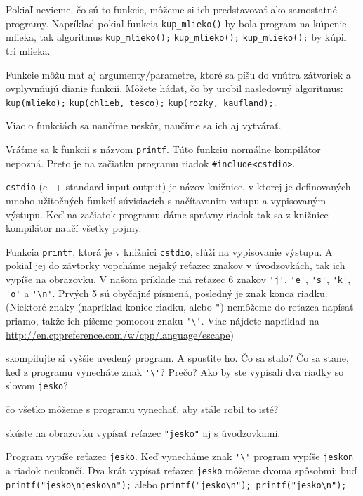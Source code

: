 \medskip

Pokiaľ nevieme, čo sú to funkcie, môžeme si ich predstavovať ako samostatné
programy. Napríklad pokiaľ funkcia \verb!kup_mlieko()! by bola program na
kúpenie mlieka, tak algoritmus \verb!kup_mlieko();! \verb!kup_mlieko();!
\verb!kup_mlieko();! by kúpil tri mlieka.

Funkcie môžu mať aj argumenty/parametre, ktoré sa píšu do vnútra zátvoriek a
ovplyvnňujú dianie funkcií. Môžete hádať, čo by urobil nasledovný algoritmus:
\verb!kup(mlieko);! \verb!kup(chlieb, tesco);! \verb!kup(rozky, kaufland);!.

Viac o funkciách sa naučíme neskôr, naučíme sa ich aj vytvárať.

\medskip

Vráťme sa k funkcii s názvom \verb!printf!. Túto funkciu normálne kompilátor
nepozná.  Preto je na začiatku programu riadok \verb!#include<cstdio>!.

\verb!cstdio! (c++ standard input output) je názov knižnice, v ktorej je
definovaných mnoho užitočných funkcií súvisiacich s načítavanim vstupu a
vypisovaným výstupu. Keď na začiatok programu dáme správny riadok tak sa z
knižnice kompilátor naučí všetky pojmy.

Funkcia \verb!printf!, ktorá je v knižnici \verb!cstdio!, slúži na vypisovanie
výstupu.  A pokiaľ jej do závtorky vopcháme nejaký reťazec znakov v
úvodzovkách, tak ich vypíše na obrazovku.  V našom príklade má reťazec 6 znakov
\verb!'j'!, \verb!'e'!, \verb!'s'!, \verb!'k'!, \verb!'o'! a \verb!'\n'!.
Prvých 5 sú obyčajné písmená, posledný je znak konca riadku. (Niektoré znaky
(napríklad koniec riadku, alebo \verb!"!) nemôžeme do reťazca napísať priamo,
takže ich píšeme pomocou znaku \verb!'\'!. Viac nájdete napríklad na
\url{http://en.cppreference.com/w/cpp/language/escape})

\medskip

 skompilujte si vyššie uvedený program. A spustite ho. Čo sa stalo?
Čo sa stane, keď z programu vynecháte znak \verb!'\'!? Prečo?  Ako by ste
vypísali dva riadky so slovom \verb!jesko!?

 čo všetko môžeme s programu vynechať, aby stále robil to isté?
 
 skúste na obrazovku vypísať reťazec \verb!"jesko"! aj s
úvodzovkami.

 Program vypíše reťazec \verb"jesko". Keď vynecháme znak \verb!'\'!
program vypíše \verb"jeskon" a riadok neukončí.  Dva krát vypísať reťazec
\verb"jesko" môžeme dvoma spôsobmi: buď \verb!printf("jesko\njesko\n");! alebo
\verb!printf("jesko\n"); printf("jesko\n");!.

